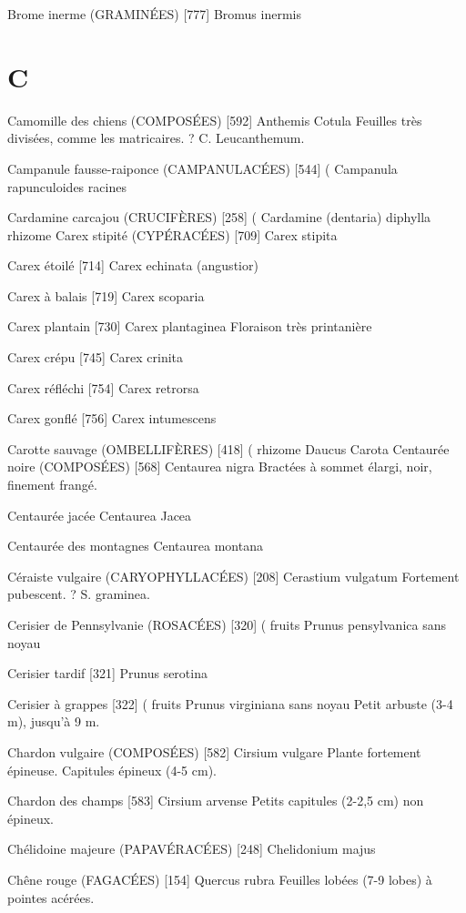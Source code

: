 Brome inerme (GRAMINÉES)  [777]
				Bromus inermis

\chapter*{C}

Camomille des chiens (COMPOSÉES)  [592]
				Anthemis Cotula
Feuilles très divisées, comme les matricaires. ? C. Leucanthemum.

Campanule fausse-raiponce (CAMPANULACÉES)  [544]		(
				Campanula rapunculoides			racines

Cardamine carcajou (CRUCIFÈRES)  [258]				 (
				Cardamine (dentaria) diphylla	       rhizome
Carex stipité (CYPÉRACÉES)  [709]
				Carex stipita

Carex étoilé  [714]
				Carex echinata (angustior)

Carex à balais  [719]
				Carex scoparia

Carex plantain  [730]
				Carex plantaginea
Floraison très printanière

Carex crépu  [745]
				Carex crinita

Carex réfléchi  [754]
				Carex retrorsa

Carex gonflé  [756]
				Carex intumescens

Carotte sauvage (OMBELLIFÈRES)  [418]			( rhizome
				Daucus Carota
Centaurée noire (COMPOSÉES)  [568]
				Centaurea nigra
Bractées à sommet élargi, noir, finement frangé.

Centaurée jacée
				Centaurea Jacea

Centaurée des montagnes
				Centaurea montana

Céraiste vulgaire (CARYOPHYLLACÉES)  [208]
				Cerastium vulgatum
Fortement pubescent. ? S. graminea.

Cerisier de Pennsylvanie (ROSACÉES)  [320]		( fruits
				Prunus pensylvanica			sans noyau

Cerisier tardif  [321]
				Prunus serotina

Cerisier à grappes  [322]						( fruits
				Prunus virginiana			sans noyau
Petit arbuste (3-4 m), jusqu’à 9 m.

Chardon vulgaire (COMPOSÉES)  [582]
				Cirsium vulgare
Plante fortement épineuse. Capitules épineux (4-5 cm).

Chardon des champs  [583]
				Cirsium arvense
Petits capitules (2-2,5 cm) non épineux.

Chélidoine majeure (PAPAVÉRACÉES)  [248]
				Chelidonium majus

Chêne rouge (FAGACÉES)  [154]
				Quercus rubra
Feuilles lobées (7-9 lobes) à pointes acérées.

